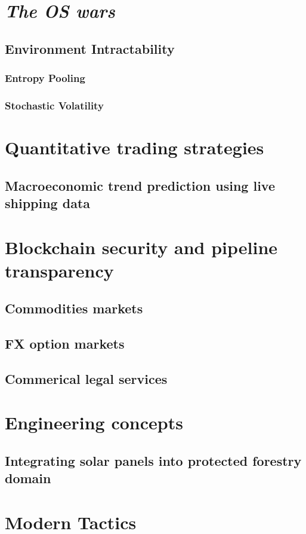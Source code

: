 \documentclass[11pt]{article}
\begin{document}
\section{\textit{The OS wars}}
\subsection{Environment Intractability}
\subsubsection{Entropy Pooling~\cite{vorobets_2024_portfolio}}
\subsubsection{Stochastic Volatility~\cite{heston_1993_a}~\cite{briciu_2024_estimating}}
\section{Quantitative trading strategies}
\subsection{Macroeconomic trend prediction using live shipping data}
\section{Blockchain security and pipeline transparency}
\subsection{Commodities markets}
\subsection{FX option markets}
\subsection{Commerical legal services}
\section{Engineering concepts}
\subsection{Integrating solar panels into protected forestry domain}
\section{Modern Tactics}
\end{document}
